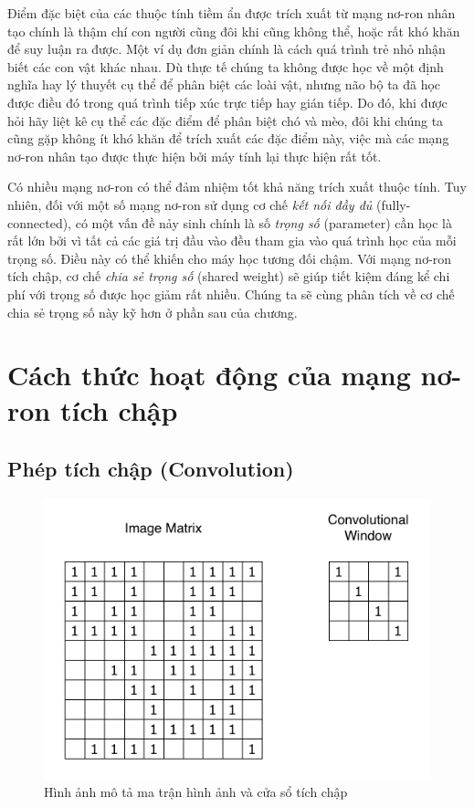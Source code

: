 Điểm đặc biệt của các thuộc tính tiềm ẩn được trích xuất từ mạng nơ-ron nhân tạo chính là thậm chí con người cũng đôi khi cũng không thể, hoặc rất khó khăn để suy luận ra được. Một ví dụ đơn giản chính là cách quá trình trẻ nhỏ nhận biết các con vật khác nhau. Dù thực tế chúng ta không được học về một định nghĩa hay lý thuyết cụ thể để phân biệt các loài vật, nhưng não bộ ta đã học được điều đó trong quá trình tiếp xúc trực tiếp hay gián tiếp. Do đó, khi được hỏi hãy liệt kê cụ thể các đặc điểm để phân biệt chó và mèo, đôi khi chúng ta cũng gặp không ít khó khăn để trích xuất các đặc điểm này, việc mà các mạng nơ-ron nhân tạo được thực hiện bởi máy tính lại thực hiện rất tốt.

Có nhiều mạng nơ-ron có thể đảm nhiệm tốt khả năng trích xuất thuộc tính. Tuy nhiên, đối với một số mạng nơ-ron sử dụng cơ chế \textit{kết nối đầy đủ} (fully-connected), có một vấn đề nảy sinh chính là số \textit{trọng số} (parameter) cần học là rất lớn bởi vì tất cả các giá trị đầu vào đều tham gia vào quá trình học của mỗi trọng số. Điều này có thể khiến cho máy học tương đối chậm. Với mạng nơ-ron tích chập, cơ chế \textit{chia sẻ trọng số} (shared weight) sẽ giúp tiết kiệm đáng kể chi phí với trọng số được học giảm rất nhiều. Chúng ta sẽ cùng phân tích về cơ chế chia sẻ trọng số này kỹ hơn ở phần sau của chương.

\section{Cách thức hoạt động của mạng nơ-ron tích chập}

\subsection{Phép tích chập (Convolution)}
\begin{figure}[!h]
	\centering
		\includegraphics[width=0.8\columnwidth]{chapter05/figure/convolution_example_sample.png}
		\centering
	\caption{Hình ảnh mô tả ma trận hình ảnh và cửa sổ tích chập}
	\label{fig:ConvolutionSample}
\end{figure}

